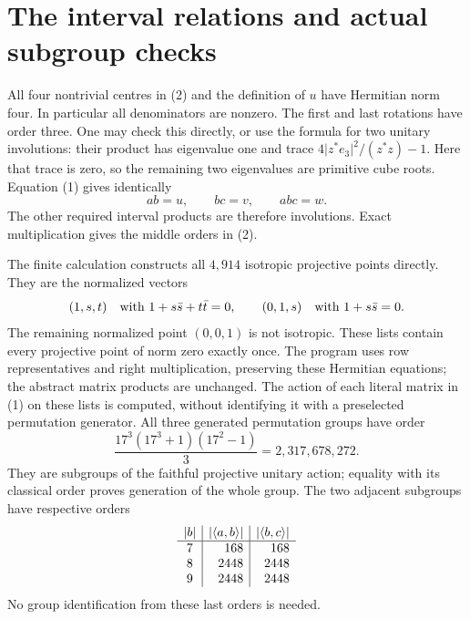 \documentclass[11pt]{article}
\begin{document}
\section*{The interval relations and actual subgroup checks}
All four nontrivial centres in (2) and the definition of $u$ have
Hermitian norm four. In particular all denominators are nonzero.
The first and last rotations have order three. One may check this
directly, or use the formula for two unitary involutions: their product
has eigenvalue one and trace $4\lvert z^*e_3\rvert^2/(z^*z)-1$.
Here that trace is zero, so the remaining two eigenvalues are primitive
cube roots. Equation (1) gives identically
\[
                       ab=u,\qquad bc=v,\qquad abc=w. \tag{4}
\]
The other required interval products are therefore involutions.
Exact multiplication gives the middle orders in (2).

The finite calculation constructs all $4,914$ isotropic projective
points directly. They are the normalized vectors
\[
 (1,s,t)\quad\hbox{with }1+s\bar s+t\bar t=0,
 \qquad (0,1,s)\quad\hbox{with }1+s\bar s=0.
\]
The remaining normalized point $(0,0,1)$ is not isotropic. These
lists contain every projective point of norm zero exactly once.
The program uses row representatives and right multiplication, preserving
these Hermitian equations; the abstract matrix products are unchanged.
The action of each literal matrix in (1) on these lists is computed,
without identifying it with a preselected permutation generator.
All three generated permutation groups have order
\[
 \frac{17^3(17^3+1)(17^2-1)}{3}=2,317,678,272.
\]
They are subgroups of the faithful projective unitary action; equality
with its classical order proves generation of the whole group.
The two adjacent subgroups have respective orders
\[
\begin{array}{c|r|r}
 |b|&|\langle a,b\rangle|&|\langle b,c\rangle|\\\hline
 7&168&168\\
 8&2448&2448\\
 9&2448&2448
\end{array}
\]
No group identification from these last orders is needed.
\end{document}
